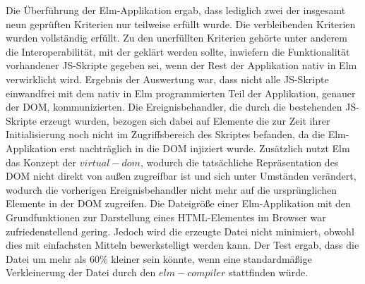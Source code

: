 Die Überführung der Elm-Applikation ergab, dass lediglich zwei der insgesamt neun geprüften Kriterien nur teilweise erfüllt wurde. Die verbleibenden Kriterien wurden vollständig erfüllt. Zu den unerfüllten Kriterien gehörte unter anderem die Interoperabilität, mit der geklärt werden sollte, inwiefern die Funktionalität vorhandener \ac{JS}-Skripte gegeben sei, wenn der Rest der Applikation nativ in Elm verwirklicht wird. Ergebnis der Auswertung war, dass nicht alle \ac{JS}-Skripte einwandfrei mit dem nativ in Elm programmierten Teil der Applikation, genauer der \ac{DOM}, kommunizierten. Die Ereignisbehandler, die durch die bestehenden \ac{JS}-Skripte erzeugt wurden, bezogen sich dabei auf Elemente die zur Zeit ihrer Initialisierung noch nicht im Zugriffsbereich des Skriptes befanden, da die Elm-Applikation erst nachträglich in die \ac{DOM} injiziert wurde. Zusätzlich nutzt Elm das Konzept der $virtual-dom$, wodurch die tatsächliche Repräsentation des \ac{DOM} nicht direkt von außen zugreifbar ist und sich unter Umständen verändert, wodurch die vorherigen Ereignisbehandler nicht mehr auf die ursprünglichen Elemente in der \ac{DOM} zugreifen. Die Dateigröße einer Elm-Applikation mit den Grundfunktionen zur Darstellung eines \ac{HTML}-Elementes im Browser war zufriedenstellend gering. Jedoch wird die erzeugte Datei nicht minimiert, obwohl dies mit einfachsten Mitteln bewerkstelligt werden kann. Der Test ergab, dass die Datei um mehr als 60\% kleiner sein könnte, wenn eine standardmäßige Verkleinerung der Datei durch den $elm-compiler$ stattfinden würde.

